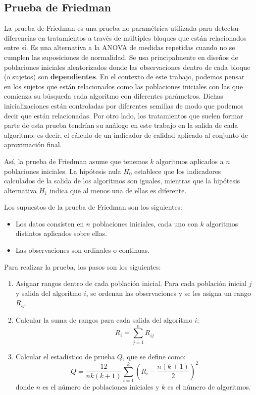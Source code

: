 \subsection{Prueba de Friedman} \label{sec:Friedman}

La prueba de Friedman \cite{hollanderNonparametricStatisticalMethods2015} es una prueba no paramétrica utilizada para detectar diferencias en tratamientos a través de múltiples bloques que están relacionados entre sí. Es una alternativa a la ANOVA de medidas repetidas cuando no se cumplen las suposiciones de normalidad. Se usa principalmente en diseños de poblaciones iniciales aleatorizados donde las observaciones dentro de cada bloque (o sujetos) son \textbf{dependientes}. En el contexto de este trabajo, podemos pensar en los sujetos que están relacionados como las poblaciones iniciales con las que comienza su búsqueda cada algoritmo con diferentes parámetros. Dichas inicializaciones están controladas por diferentes semillas de modo que podemos decir que están relacionadas. Por otro lado, los tratamientos que suelen formar parte de esta prueba tendrían su análogo en este trabajo en la salida de cada algoritmo; es decir, el cálculo de un indicador de calidad aplicado al conjunto de aproximación final.  

Así, la prueba de Friedman asume que tenemos \( k \) algoritmos aplicados a \( n \) poblaciones iniciales. La hipótesis nula \( H_0 \) establece que los indicadores calculados de la salida de los algoritmos son iguales, mientras que la hipótesis alternativa \( H_1 \) indica que al menos una de ellas es diferente.

Los supuestos de la prueba de Friedman son los siguientes:
\begin{itemize}
    \item Los datos consisten en \( n \) poblaciones iniciales, cada uno con \( k \) algoritmos distintos aplicados sobre ellas.
    \item Las observaciones son ordinales o continuas.
\end{itemize}

Para realizar la prueba, los pasos son los siguientes:

\begin{enumerate}
    \item Asignar rangos dentro de cada población inicial. Para cada población inicial \( j \) y salida del algoritmo \( i \), se ordenan las observaciones y se les asigna un rango \( R_{ij} \).
    \item Calcular la suma de rangos para cada salida del algoritmo \( i \):
    \[
        R_i = \sum_{j=1}^{n} R_{ij}
        \]
\item Calcular el estadístico de prueba \( Q \), que se define como:
        \[
            Q = \frac{12}{nk(k+1)} \sum_{i=1}^{k} \left( R_i - \frac{n(k+1)}{2} \right)^2
            \]
            donde \( n \) es el número de poblaciones iniciales y \( k \) es el número de algoritmos.
        \end{enumerate}

